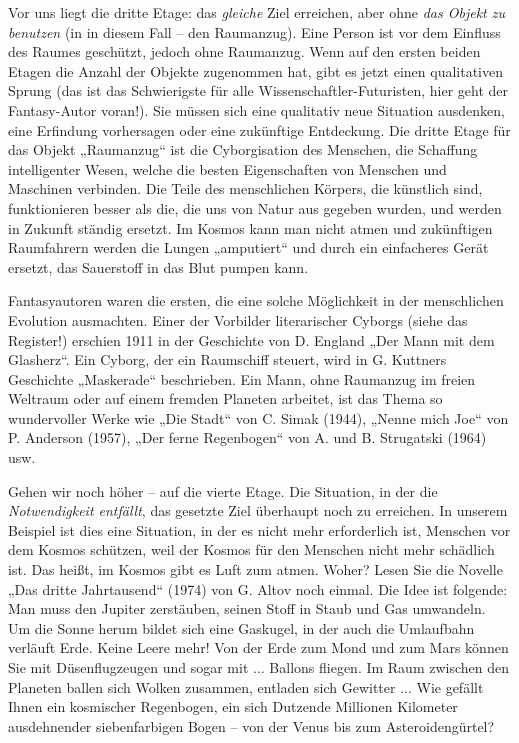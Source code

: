 \documentclass[11pt,a4paper]{article}
\begin{document}
Vor uns liegt die dritte Etage: das \emph{gleiche} Ziel erreichen, aber ohne
\emph{das Objekt zu benutzen} (in in diesem Fall -- den Raumanzug). Eine
Person ist vor dem Einfluss des Raumes geschützt, jedoch ohne Raumanzug. Wenn
auf den ersten beiden Etagen die Anzahl der Objekte zugenommen hat, gibt es
jetzt einen qualitativen Sprung (das ist das Schwierigste für alle
Wissenschaftler-Futuristen, hier geht der Fantasy-Autor voran!). Sie müssen
sich eine qualitativ neue Situation ausdenken, eine Erfindung vorhersagen oder
eine zukünftige Entdeckung. Die dritte Etage für das Objekt „Raumanzug“ ist
die Cyborgisation des Menschen, die Schaffung intelligenter Wesen, welche die
besten Eigenschaften von Menschen und Maschinen verbinden. Die Teile des
menschlichen Körpers, die künstlich sind, funktionieren besser als die, die
uns von Natur aus gegeben wurden, und werden in Zukunft ständig ersetzt.  Im
Kosmos kann man nicht atmen und zukünftigen Raumfahrern werden die Lungen
„amputiert“ und durch ein einfacheres Gerät ersetzt, das Sauerstoff in das
Blut pumpen kann.

Fantasyautoren waren die ersten, die eine solche Möglichkeit in der
menschlichen Evolution ausmachten. Einer der Vorbilder literarischer Cyborgs
(siehe das Register!) erschien 1911 in der Geschichte von D. England „Der Mann
mit dem Glasherz“. Ein Cyborg, der ein Raumschiff steuert, wird in G. Kuttners
Geschichte „Maskerade“ beschrieben. Ein Mann, ohne Raumanzug im freien
Weltraum oder auf einem fremden Planeten arbeitet, ist das Thema so
wundervoller Werke wie „Die Stadt“ von C. Simak (1944), „Nenne mich Joe“ von
P. Anderson (1957), „Der ferne Regenbogen“ von A. und B. Strugatski (1964)
usw.

Gehen wir noch höher -- auf die vierte Etage. Die Situation, in der die
\emph{Notwendigkeit entfällt}, das gesetzte Ziel überhaupt noch zu
erreichen. In unserem Beispiel ist dies eine Situation, in der es nicht mehr
erforderlich ist, Menschen vor dem Kosmos schützen, weil der Kosmos für den
Menschen nicht mehr schädlich ist. Das heißt, im Kosmos gibt es Luft zum
atmen.  Woher? Lesen Sie die Novelle „Das dritte Jahrtausend“ (1974) von
G. Altov noch einmal. Die Idee ist folgende: Man muss den Jupiter zerstäuben,
seinen Stoff in Staub und Gas umwandeln. Um die Sonne herum bildet sich eine
Gaskugel, in der auch die Umlaufbahn verläuft Erde. Keine Leere mehr! Von der
Erde zum Mond und zum Mars können Sie mit Düsenflugzeugen und sogar mit
... Ballons fliegen. Im Raum zwischen den Planeten ballen sich Wolken
zusammen, entladen sich Gewitter ... Wie gefällt Ihnen ein kosmischer
Regenbogen, ein sich Dutzende Millionen Kilometer ausdehnender siebenfarbigen
Bogen -- von der Venus bis zum Asteroidengürtel?
\end{document}
